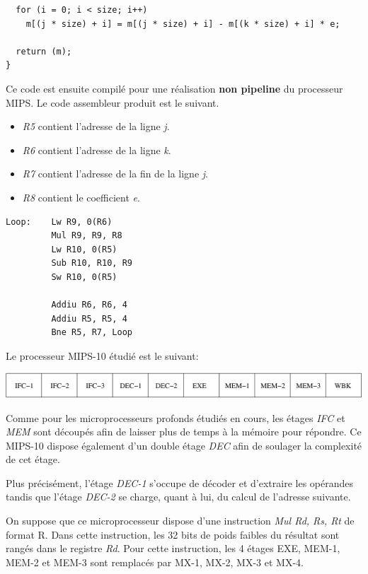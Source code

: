 {\begin{verbatim}
  for (i = 0; i < size; i++)
    m[(j * size) + i] = m[(j * size) + i] - m[(k * size) + i] * e;

  return (m);
}
\end{verbatim}

Ce code est ensuite compil\'e pour une r\'ealisation \textbf{non pipeline}
du processeur MIPS. Le code assembleur produit est le suivant.

\begin{itemize}
  \item
    \textit{R5} contient l'adresse de la ligne \textit{j}.
  \item
    \textit{R6} contient l'adresse de la ligne \textit{k}.
  \item
    \textit{R7} contient l'adresse de la fin de la ligne \textit{j}.
  \item
    \textit{R8} contient le coefficient \textit{e}.
\end{itemize}

\begin{verbatim}
Loop:    Lw R9, 0(R6)
         Mul R9, R9, R8
         Lw R10, 0(R5)
         Sub R10, R10, R9
         Sw R10, 0(R5)

         Addiu R6, R6, 4
         Addiu R5, R5, 4
         Bne R5, R7, Loop
\end{verbatim}

Le processeur MIPS-10 \'etudi\'e est le suivant:

\begin{center}
  \includegraphics[scale=0.6]{figures/pipeline.pdf}
\end{center}

Comme pour les microprocesseurs profonds \'etudi\'es en cours, les \'etages
\textit{IFC} et \textit{MEM} sont d\'ecoup\'es afin de laisser plus de temps
\`a la m\'emoire pour r\'epondre. Ce MIPS-10 dispose \'egalement d'un
double \'etage \textit{DEC} afin de soulager la complexit\'e de cet \'etage.

Plus pr\'ecis\'ement, l'\'etage \textit{DEC-1} s'occupe de d\'ecoder et
d'extraire les op\'erandes tandis que l'\'etage \textit{DEC-2} se charge,
quant \`a lui, du calcul de l'adresse suivante.

On suppose que ce microprocesseur dispose d'une instruction
\textit{Mul Rd, Rs, Rt} de format R. Dans cette instruction, les 32 bits
de poids faibles du r\'esultat sont rang\'es dans le registre \textit{Rd}.
Pour cette instruction, les 4 \'etages EXE, MEM-1, MEM-2 et MEM-3 sont
remplac\'es par MX-1, MX-2, MX-3 et MX-4.

}
